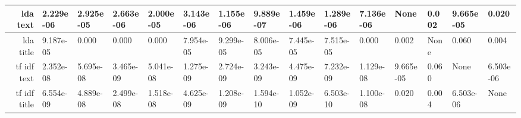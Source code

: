 \begin{tabular}{|r|l|l|l|l|l|l|l|l|l|l|l|l|l|l|}
  lda text & 2.229e-06 & 2.925e-05 & 2.663e-06 & 2.000e-05 & 3.143e-06 & 1.155e-06 & 9.889e-07 & 1.459e-06 & 1.289e-06 & 7.136e-06 & None & 0.002 & 9.665e-05 & 0.020 \\ 
  \hline
  lda title & 9.187e-05 & 0.000 & 0.000 & 0.000 & 7.954e-05 & 9.299e-05 & 8.006e-05 & 7.445e-05 & 7.515e-05 & 0.000 & 0.002 & None & 0.060 & 0.004 \\ 
  \hline
  tf idf text & 2.352e-08 & 5.695e-08 & 3.465e-09 & 5.041e-08 & 1.275e-09 & 2.724e-09 & 3.243e-09 & 4.475e-09 & 7.232e-09 & 1.129e-08 & 9.665e-05 & 0.060 & None & 6.503e-06 \\ 
  \hline
  tf idf title & 6.554e-09 & 4.889e-08 & 2.499e-08 & 1.518e-08 & 4.625e-09 & 1.208e-09 & 1.594e-10 & 1.052e-09 & 6.503e-10 & 1.100e-08 & 0.020 & 0.004 & 6.503e-06 & None \\ 
  \hline
\end{tabular}

